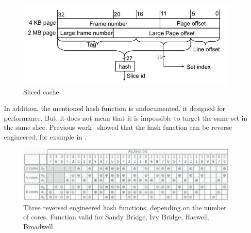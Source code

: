 \begin{figure}[!ht]
    \centering
    \includegraphics[width=\textwidth]{images/chapter_6/slicedcache.JPG}
    \caption{Sliced cache.}
    \label{fig:slicedcache}
\end{figure}

In addition, the mentioned hash function is undocumented, it designed for
performance. But, it does not mean that it is impossible to target the same set
in the same slice. Previous work~\cite{EURECOM+4671} showed that the hash
function can be reverse engineered, for example in .

\begin{figure}[!ht]
    \centering
    \includegraphics[width=\textwidth]{images/chapter_6/hashfunc.JPG}
    \caption{Three reversed engineered hash functions, depending on the number of cores. Function valid for Sandy Bridge, Ivy Bridge, Haswell, Broadwell}
    \label{fig:hashfunc}
\end{figure}

